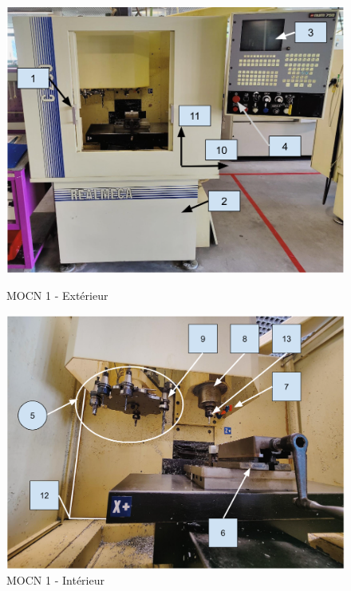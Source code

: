 \documentclass[12pt]{article}
\begin{document}
\begin{figure}
\centering
\includegraphics[width=0.7\linewidth]{MOCN11.PNG}
\caption{MOCN 1 - Extérieur}
\label{MOCN11}


\centering
\includegraphics[width=0.7\linewidth]{MOCN12.PNG}
\caption{MOCN 1 - Intérieur}
\label{MOCN12}
\end{figure}
\end{document}
